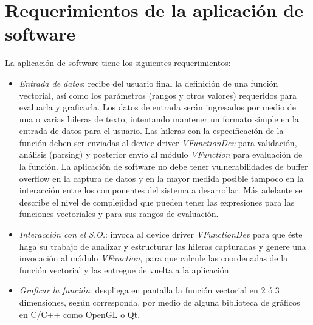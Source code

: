 \documentclass[12pt,letterpaper]{article}
\begin{document}
\section*{Requerimientos de la aplicación de software}
La aplicación de software tiene los siguientes requerimientos: 
\begin{itemize}                                                                                                                                                                                                                                                                                                                                                                                                                                                                                                                                                            \item \textit{Entrada de datos}: recibe del usuario final la definición de una función vectorial, así como los parámetros (rangos y otros valores) requeridos para evaluarla y graficarla. Los datos de entrada serán ingresados por medio de una o varias hileras de texto, intentando mantener un formato simple en la entrada de datos para el usuario. Las hileras con la especificación de la función deben ser enviadas al device driver \textit{VFunctionDev} para validación, análisis (parsing) y posterior envío al módulo \textit{VFunction} para evaluación de la función. La aplicación de software no debe tener vulnerabilidades de buffer overflow en la captura de datos y en la mayor medida posible tampoco en la interacción entre los componentes del sistema a desarrollar. Más adelante se describe el nivel de complejidad que pueden tener las expresiones para las funciones vectoriales y para sus rangos de evaluación.
\item \textit{Interacción con el S.O.}: invoca al device driver \textit{VFunctionDev} para que éste haga su trabajo de analizar y estructurar las hileras capturadas y genere una invocación al módulo \textit{VFunction}, para que calcule las coordenadas de la función vectorial y las entregue de vuelta a la aplicación. 
\item \textit{Graficar la función}: despliega en pantalla la función vectorial en 2 ó 3 dimensiones, según corresponda, por medio de alguna biblioteca de gráficos en C/C++ como OpenGL o Qt.                                                                                                                                                                                                                                                                                                                                                                                                                                                                                                                                                                 

\end{itemize}
\end{document}
